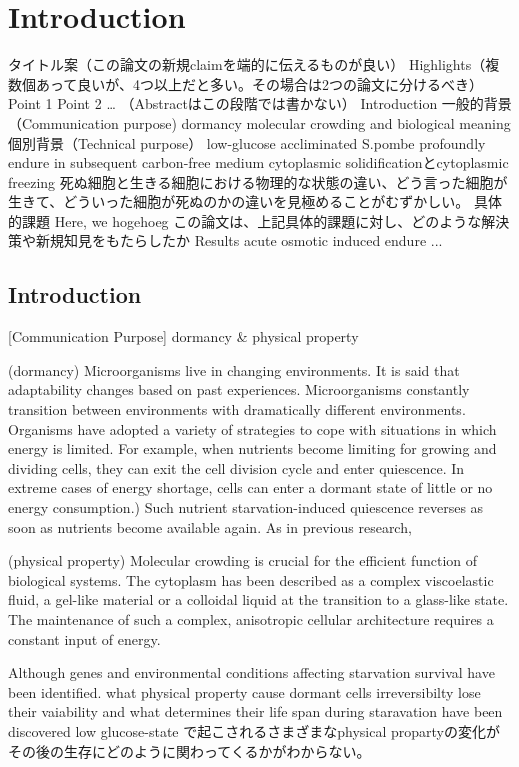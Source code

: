 \chapter{Introduction}
タイトル案（この論文の新規claimを端的に伝えるものが良い）
Highlights（複数個あって良いが、4つ以上だと多い。その場合は2つの論文に分けるべき）
Point 1
Point 2
…
（Abstractはこの段階では書かない）
Introduction
一般的背景（Communication purpose)
dormancy
molecular crowding and biological meaning
個別背景（Technical purpose）
low-glucose accliminated S.pombe profoundly endure in subsequent carbon-free medium
cytoplasmic solidificationとcytoplasmic freezing
死ぬ細胞と生きる細胞における物理的な状態の違い、どう言った細胞が生きて、どういった細胞が死ぬのかの違いを見極めることがむずかしい。
具体的課題
Here, we hogehoeg
この論文は、上記具体的課題に対し、どのような解決策や新規知見をもたらしたか
Results
acute
osmotic induced endure
... 

\section{Introduction}
[Communication Purpose] 
dormancy \& physical property

(dormancy)
Microorganisms live in changing environments. It is said that adaptability changes based on past experiences. 
Microorganisms constantly transition between environments with dramatically different environments. 
Organisms have adopted a variety of strategies to cope with situations in which energy is limited. 
For example, when nutrients become limiting for growing and dividing cells, they can exit the cell division cycle and enter quiescence.
In extreme cases of energy shortage, cells can enter a dormant state of little or no energy consumption.)
Such nutrient starvation-induced quiescence reverses as soon as nutrients become available again.
As in previous research, 

(physical property)
Molecular crowding is crucial for the efficient function of biological systems. \cite{lohka1985induction}\cite{zhou2008macromolecular}\cite{miermont2013severe}\cite{chen2024viscosity}\cite{neurohr2020relevance}
The cytoplasm has been described as a complex viscoelastic fluid, a gel-like material or a colloidal liquid at the transition to a glass-like state.\cite{nishizawa2017universal}
The maintenance of such a complex, anisotropic cellular architecture requires a constant input of energy. \cite{ebata2023activity}

Although genes and environmental conditions affecting starvation survival have been identified. what physical property cause dormant cells irreversibilty lose their vaiability and what determines their life span during staravation have been discovered
low glucose-state で起こされるさまざまなphysical propartyの変化がその後の生存にどのように関わってくるかがわからない。 



